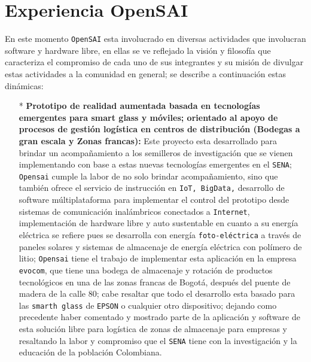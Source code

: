 \documentclass[jou]{apa6} %
\begin{document}
\section{Experiencia OpenSAI}

En este momento \texttt{OpenSAI} esta involucrado en diversas actividades que involucran software y hardware libre, en ellas se ve reflejado la visión y filosofía que caracteriza el compromiso de cada uno de sus integrantes y su misión de divulgar estas actividades a la comunidad en general; se describe a continuación estas dinámicas:

\begin{enumerate}
\item[*] \textbf{Prototipo de realidad aumentada basada en tecnologías emergentes para smart glass y móviles; orientado al apoyo de procesos de gestión logística en centros de distribución (Bodegas a gran escala y Zonas francas):} Este proyecto esta desarrollado para brindar un acompañamiento a los semilleros de investigación que se vienen implementando con base a estas nuevas tecnologías emergentes en el \texttt{SENA}; \texttt{Opensai} cumple la labor de no solo brindar acompañamiento, sino que también ofrece el servicio de instrucción en \texttt{IoT, BigData,} desarrollo de software múltiplataforma para implementar el control del prototipo desde sistemas de comunicación inalámbricos conectados a \texttt{Internet}, implementación de hardware libre y auto sustentable  en cuanto a su energía eléctrica se refiere pues se desarrolla con energía \texttt{foto-eléctrica} a través de paneles solares y sistemas de almacenaje de energía eléctrica con polímero de litio; \texttt{Opensai} tiene el trabajo de implementar esta aplicación en la empresa \texttt{evocom}, que tiene una bodega de almacenaje y rotación de productos tecnológicos en una de las zonas francas de Bogotá, después del puente de madera de la calle 80; cabe resaltar que todo el desarrollo esta basado para las \texttt{smarth glass} de \texttt{EPSON} o cualquier otro dispositivo; dejando como precedente haber comentado y mostrado parte de la aplicación y software de esta solución libre para logística de zonas de almacenaje para empresas y resaltando la labor y compromiso que el   \texttt{SENA} tiene con la investigación y la educación de la población Colombiana.


\end{enumerate}
\end{document}
